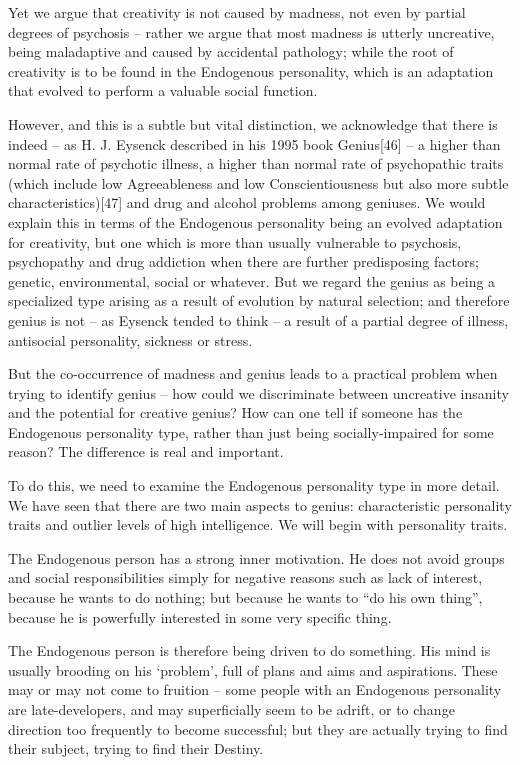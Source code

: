 \documentclass[
]{book}
\begin{document}
Yet we argue that creativity is not caused by madness, not even by partial degrees of psychosis -- rather we argue that most madness is utterly uncreative, being maladaptive and caused by accidental pathology; while the root of creativity is to be found in the Endogenous personality, which is an adaptation that evolved to perform a valuable social function.

However, and this is a subtle but vital distinction, we acknowledge that there is indeed -- as H. J. Eysenck described in his 1995 book Genius{[}46{]} -- a higher than normal rate of psychotic illness, a higher than normal rate of psychopathic traits (which include low Agreeableness and low Conscientiousness but also more subtle characteristics){[}47{]} and drug and alcohol problems among geniuses. We would explain this in terms of the Endogenous personality being an evolved adaptation for creativity, but one which is more than usually vulnerable to psychosis, psychopathy and drug addiction when there are further predisposing factors; genetic, environmental, social or whatever. But we regard the genius as being a specialized type arising as a result of evolution by natural selection; and therefore genius is not -- as Eysenck tended to think -- a result of a partial degree of illness, antisocial personality, sickness or stress.

But the co-occurrence of madness and genius leads to a practical problem when trying to identify genius -- how could we discriminate between uncreative insanity and the potential for creative genius? How can one tell if someone has the Endogenous personality type, rather than just being socially-impaired for some reason? The difference is real and important.

To do this, we need to examine the Endogenous personality type in more detail. We have seen that there are two main aspects to genius: characteristic personality traits and outlier levels of high intelligence. We will begin with personality traits.

The Endogenous person has a strong inner motivation. He does not avoid groups and social responsibilities simply for negative reasons such as lack of interest, because he wants to do nothing; but because he wants to ``do his own thing'', because he is powerfully interested in some very specific thing.

The Endogenous person is therefore being driven to do something. His mind is usually brooding on his `problem', full of plans and aims and aspirations. These may or may not come to fruition -- some people with an Endogenous personality are late-developers, and may superficially seem to be adrift, or to change direction too frequently to become successful; but they are actually trying to find their subject, trying to find their Destiny.
\end{document}
